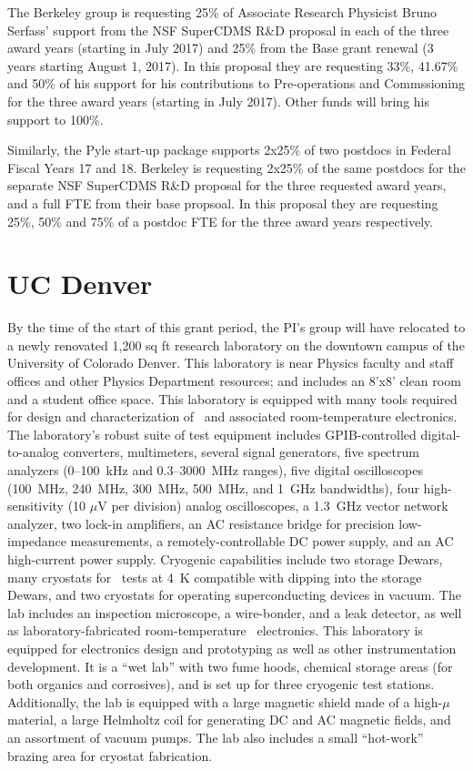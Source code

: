 The Berkeley group is requesting 25\% of Associate Research Physicist  Bruno Serfass' support from the NSF SuperCDMS R\&D proposal in each of the three award years (starting in July 2017) and 25\% from the Base grant renewal (3 years starting August 1, 2017). In this proposal they are requesting  33\%, 41.67\% and 50\% of his support for his contributions to Pre-operations and Commssioning for the three award years (starting in July 2017). Other funds will bring his support to 100\%.

Similarly, the Pyle start-up package supports 2x25\% of two postdocs in Federal Fiscal Years 17 and 18. Berkeley is requesting 2x25\% of the same postdocs for the separate NSF SuperCDMS R\&D proposal for the three requested award years, and a full FTE  from their base propsoal.  In this proposal they are requesting 25\%, 50\% and 75\% of a postdoc FTE for the three award years respectively. 

\section{UC Denver}
 By the time of the start of this grant period, the PI's group will have relocated to a newly renovated 1,200 sq ft research laboratory on the downtown campus of the University of Colorado Denver. This laboratory is near Physics faculty and staff offices and other Physics Department resources; and includes an 8'x8' clean room and a student office space. This laboratory is equipped with many  tools required for design and characterization of \SQUIDs\ and associated room-temperature electronics. The laboratory's robust suite of test equipment includes GPIB-controlled digital-to-analog converters, multimeters, several signal generators, five spectrum analyzers (0--100~kHz and 0.3--3000~MHz ranges), five digital oscilloscopes (100~MHz, 240~MHz, 300~MHz, 500~MHz, and 1~GHz bandwidths), four high-sensitivity (10 $\mu$V per division) analog oscilloscopes, a 1.3~GHz vector network analyzer, two lock-in amplifiers, an AC resistance bridge for precision low-impedance measurements, a remotely-controllable DC power supply, and an AC high-current power supply. Cryogenic capabilities include two storage Dewars, many cryostats for \SQUID\ tests at 4~K compatible with dipping into the storage Dewars, and two cryostats for operating superconducting devices in vacuum. The lab includes an inspection microscope, a wire-bonder, and a leak detector, as well as laboratory-fabricated room-temperature \SQUID\ electronics. This laboratory is equipped for electronics design and prototyping as well as other instrumentation development. It is a ``wet lab'' with two fume hoods, chemical storage areas (for both organics and corrosives), and is set up for three cryogenic test stations. Additionally, the lab is equipped with a large magnetic shield made of a high-$\mu$ material, a large Helmholtz coil for generating DC and AC magnetic fields, and an assortment of vacuum pumps. The lab also includes a small ``hot-work'' brazing area for cryostat fabrication.


